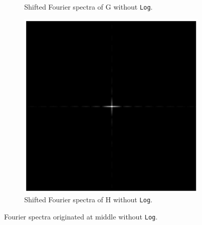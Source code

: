 \documentclass[11pt,a4paper]{article}
\begin{document}
\begin{figure}[!ht]
\begin{subfigure}[t]{.32\linewidth}
	\caption{Shifted Fourier spectra of G without \texttt{Log}.}
	\label{fig:Ghat_Shift_Abs}
	\end{subfigure}
	\begin{subfigure}[t]{.32\linewidth} %
	\includegraphics[width=\columnwidth]{Linearity_Hhat_Shift_Abs.eps}
	\caption{Shifted Fourier spectra of H without \texttt{Log}.}
	\label{fig:Hhat_Shift_Abs}
	\end{subfigure}
	\caption{Fourier spectra originated at middle without \texttt{Log}.}
	\label{fig:shiftedSpactrumNoLog}
\end{figure}
\end{document}
